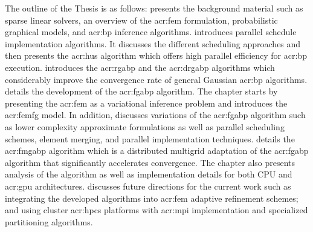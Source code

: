 The outline of the Thesis is as follows:
 presents the background material such as sparse linear solvers, an overview of the \gls{acr:fem} formulation, probabilistic graphical models, and \gls{acr:bp} inference algorithms.
 introduces parallel schedule implementation algorithms.
It discusses the different scheduling approaches and then presents the \gls{acr:hus} algorithm which offers high parallel efficiency for \gls{acr:bp} execution.
 introduces the \gls{acr:rgabp} and the \gls{acr:drgabp} algorithms which considerably improve the convergence rate of general Gaussian \gls{acr:bp} algorithms.
 details the development of the \gls{acr:fgabp} algorithm.
The chapter starts by presenting the \gls{acr:fem} as a variational inference problem and introduces the \gls{acr:femfg} model.
In addition,  discusses variations of the \gls{acr:fgabp} algorithm such as lower complexity approximate formulations as well as parallel scheduling schemes, element merging, and parallel implementation techniques.
 details the \gls{acr:fmgabp} algorithm which is a distributed multigrid adaptation of the \gls{acr:fgabp} algorithm that significantly accelerates convergence.
The chapter also presents analysis of the algorithm as well as implementation details for both CPU and \gls{acr:gpu} architectures.
 discusses future directions for the current work such as integrating the developed algorithms into \gls{acr:fem} adaptive refinement schemes; and using cluster \glspl{acr:hpc} platforms with \gls{acr:mpi} implementation and specialized partitioning algorithms.








